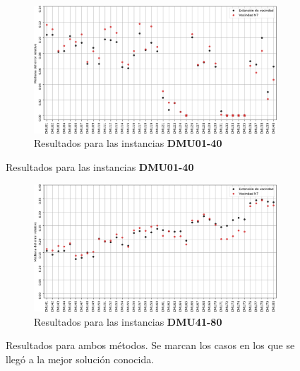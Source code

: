 \begin{figure}[H]
    \begin{subfigure}{\textwidth}
        \centering
        \includegraphics[scale=.6]{Imagenes/n8vsn7err1.png}
        \caption{Resultados para las instancias \textbf{DMU01-40}}
    \end{subfigure}
\end{figure}
\begin{figure}[H]\ContinuedFloat
    \begin{subfigure}{\textwidth}
        \centering
        \includegraphics[scale=.6]{Imagenes/n8vsn7err2.png}
        \caption{Resultados para las instancias \textbf{DMU41-80}}
    \end{subfigure}
    \caption{Resultados para ambos métodos. Se marcan los casos en los que se llegó a la mejor solución conocida.}
\end{figure}

